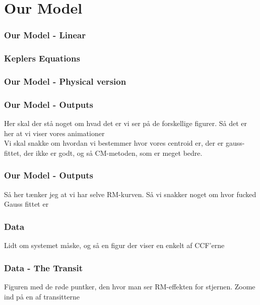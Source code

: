 \documentclass[show notes]{beamer}
\begin{document}
\begin{frame}
\frametitle{}

\end{frame}

\section{Our Model}

\begin{frame}
\frametitle{Our Model - Linear}

\end{frame}


\begin{frame}
\frametitle{Keplers Equations}	
	
\end{frame}


\begin{frame}
\frametitle{Our Model - Physical version}

\end{frame}


\begin{frame}
\frametitle{Our Model - Outputs}
	Her skal der stå noget om hvad det er vi ser på de forskellige figurer. Så det er her at vi viser vores animationer\\
	
	Vi skal snakke om hvordan vi bestemmer hvor vores centroid er, der er gauss-fittet, der ikke er godt, og så CM-metoden, som er meget bedre.
\end{frame}

\begin{frame}
\frametitle{Our Model - Outputs}

Så her tænker jeg at vi har selve RM-kurven. Så vi snakker noget om hvor fucked Gauss fittet er
\end{frame}

\begin{frame}
\frametitle{Data}
Lidt om systemet måske, og så en figur der viser en enkelt af CCF'erne
\end{frame}

\begin{frame}
\frametitle{Data - The Transit}
Figuren med de røde puntker, den hvor man ser RM-effekten for stjernen. Zoome ind på en af transitterne

\end{frame}
\end{document}
